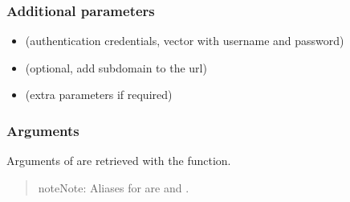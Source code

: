 \documentclass[a4paper,12pt,english]{sphinxhowto}
\begin{document}
\subsubsection{Additional parameters}
\label{\detokenize{Sciencedata_dk:additional-parameters}}\begin{itemize}
\item {} 
 (authentication credentials, vector with username and password)

\item {} 
 (optional, add subdomain to the url)

\item {} 
 (extra parameters if required)

\end{itemize}



\subsubsection{Arguments}
\label{\detokenize{Sciencedata_dk:arguments}}
Arguments of  are retrieved with the  function.

\begin{sphinxVerbatim}[commandchars=\\\{\},formatcom=\footnotesize]
 
\end{sphinxVerbatim}

\begin{quote}

\begin{sphinxadmonition}{note}{Note:}
Aliases for  are  and .
\end{sphinxadmonition}
\end{quote}
\end{document}
